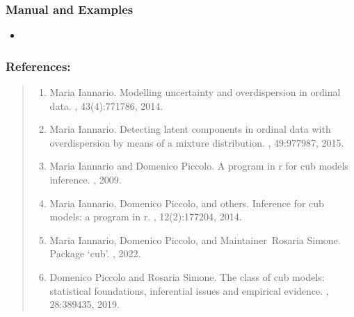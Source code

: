 \documentclass[letterpaper,10pt,english]{sphinxmanual}
\begin{document}
\subsubsection{Manual and Examples}
\label{\detokenize{cubmods:id291}}\begin{itemize}
\item {} 
\sphinxAtStartPar
{}

\end{itemize}


\subsubsection{References:}
\label{\detokenize{cubmods:id292}}\begin{quote}
\begin{enumerate}
%
\setcounter{enumi}{0}
\item {} 
\sphinxAtStartPar
Maria Iannario. Modelling uncertainty and overdispersion in ordinal data. , 43(4):771\textendash{}786, 2014.

\item {} 
\sphinxAtStartPar
Maria Iannario. Detecting latent components in ordinal data with overdispersion by means of a mixture distribution. , 49:977\textendash{}987, 2015.

\item {} 
\sphinxAtStartPar
Maria Iannario and Domenico Piccolo. A program in r for cub models inference. , 2009.

\item {} 
\sphinxAtStartPar
Maria Iannario, Domenico Piccolo, and others. Inference for cub models: a program in r. , 12(2):177\textendash{}204, 2014.

\item {} 
\sphinxAtStartPar
Maria Iannario, Domenico Piccolo, and Maintainer Rosaria Simone. Package ‘cub’. , 2022.

\item {} 
\sphinxAtStartPar
Domenico Piccolo and Rosaria Simone. The class of cub models: statistical foundations, inferential issues and empirical evidence. , 28:389\textendash{}435, 2019.

\end{enumerate}
\end{quote}
\end{document}
